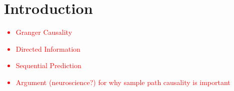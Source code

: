 \section{Introduction}

\textcolor{red}
{\begin{itemize}
    \item Granger Causality
    \item Directed Information
    \item Sequential Prediction
    \item Argument (neuroscience?) for why sample path causality is important
\end{itemize}}

